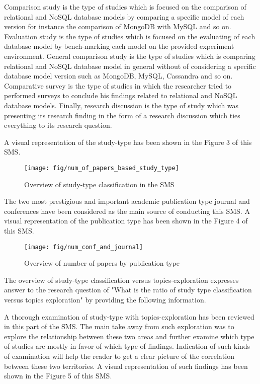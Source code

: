 \documentclass[sigconf,nonacm]{acmart}
\begin{document}
Comparison study is the type of studies which is focused on the comparison of relational and NoSQL database models by comparing a specific model of each version for instance the comparison of MongoDB with MySQL and so on. Evaluation study is the type of studies which is focused on the evaluating of each database model by bench-marking each model on the provided experiment environment. General comparison study is the type of studies which is comparing relational and NoSQL database model in general without of considering a specific database model version such as MongoDB, MySQL, Cassandra and so on. Comparative survey is the type of studies in which the researcher tried to performed surveys to conclude his findings related to relational and NoSQL database models. Finally, research discussion is the type of study which was presenting its research finding in the form of a research discussion which ties everything to its research question.

 A visual representation of the study-type has been shown in the Figure 3 of this SMS.

\begin{figure}[H]
  \centering
  \texttt{[image: fig/num\_of\_papers\_based\_study\_type]}
  \caption{Overview of study-type classification in the SMS}
\end{figure}

The two most prestigious and important academic publication type journal and conferences have been considered as the main source of conducting this SMS. A visual representation of the publication type has been shown in the Figure 4 of this SMS.  

\begin{figure}[H]
  \centering
  \texttt{[image: fig/num\_conf\_and\_journal]}
  \caption{Overview of number of papers by publication type}
\end{figure}

The overview of study-type classification versus topics-exploration expresses answer to the research question of "What is the ratio of study type classification versus topics exploration" by providing the following information.

A thorough examination of  study-type with topics-exploration has been reviewed in this part of the SMS. The main take away from such exploration was to explore the relationship between these two areas and further examine which type of studies are mostly in favor of which type of findings. Indication of such kinds of examination will help the reader to get a clear picture of the correlation between these two territories. A visual representation of such findings has been shown in the Figure 5 of this SMS.  
\end{document}
